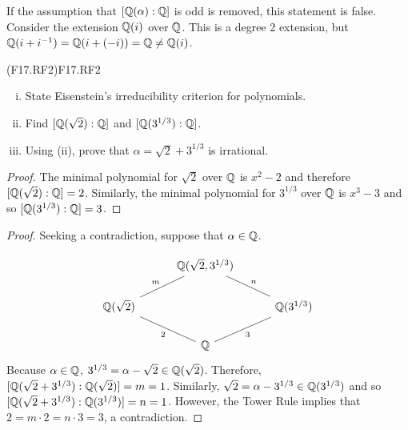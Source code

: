 \documentclass[../AlgebraQualSolutions.tex]{subfiles}
\begin{document}
If the assumption that $[\mathbb{Q}(\alpha): \mathbb{Q}]$ is odd is removed, this statement is false. Consider the extension $\mathbb{Q}(i)$ over $\mathbb{Q}$. This is a degree 2 extension, but $\mathbb{Q}(i + i^{-1}) = \mathbb{Q}(i + (-i)) = \mathbb{Q} \neq \mathbb{Q}(i)$.

\begin{prob}{(F17.RF2)}{F17.RF2}
	\begin{enumerate}[(i)]
		\item State Eisenstein's irreducibility criterion for polynomials.
		\item Find $[\mathbb{Q}(\sqrt 2): \mathbb{Q}]$ and $[\mathbb{Q}(3^{1/3}): \mathbb{Q}]$.
		\item Using (ii), prove that $\alpha = \sqrt{2}+3^{1/3}$ is irrational.
	\end{enumerate}
\end{prob}

\begin{proof}
	The minimal polynomial for $\sqrt2$ over $\mathbb{Q}$ is $x^2 - 2$ and therefore $[\mathbb{Q}(\sqrt 2): \mathbb{Q}] =2$. Similarly, the minimal polynomial for $3^{1/3}$ over $\mathbb{Q}$ is $x^3 - 3$ and so $[\mathbb{Q}(3^{1/3}): \mathbb{Q}] = 3$.
\end{proof}

\begin{proof}
	Seeking a contradiction, suppose that $\alpha \in \mathbb{Q}$.

	\[
		\begin{tikzcd}[column sep=1cm]
		  & \Q(\sqrt2,3^{1/3}) & \\
		  \Q(\sqrt2) \ar[ru, no head,"m"]& & \ar[lu, no head,"n"'] \Q(3^{1/3}) \\
		  & \Q \ar[lu, no head, "2"] \ar[ru, no head, "3"']&
		\end{tikzcd}
		\]
	Because $\alpha \in \mathbb{Q}$, $3^{1/3} = \alpha - \sqrt2 \in \mathbb{Q}(\sqrt2)$. Therefore, $[\mathbb{Q}(\sqrt2 + 3^{1/3}): \mathbb{Q}(\sqrt2)] = m = 1$. Similarly, $\sqrt{2} = \alpha - 3^{1/3} \in \mathbb{Q}(3^{1/3})$ and so $[\mathbb{Q}(\sqrt2 + 3^{1/3}): \mathbb{Q}(3^{1/3})] = n = 1$. However, the Tower Rule implies that $2 = m\cdot2 = n\cdot 3 = 3$, a contradiction. 
\end{proof}
\end{document}

